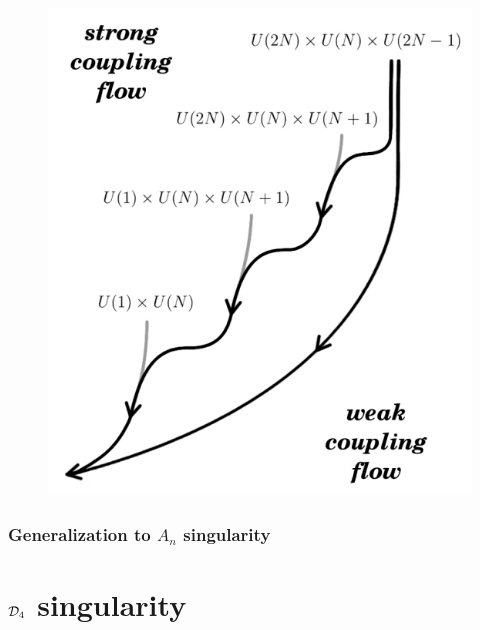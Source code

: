     \begin{figure}[H]
        \centering
        \includegraphics[scale=0.3]{Pictures/cascadeduality.png}
    \end{figure}



\section{Generalization to $A_n$ singularity}

\part{$\mathcal{D}_4$ singularity}